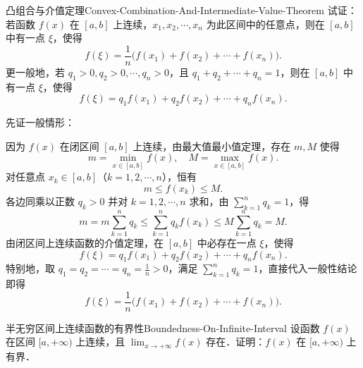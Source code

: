 \begin{problem}{凸组合与介值定理}{Convex-Combination-And-Intermediate-Value-Theorem}
    试证：若函数 $f(x)$ 在 $[a, b]$ 上连续，$x_1, x_2, \cdots, x_n$ 为此区间中的任意点，则在 $[a, b]$ 中有一点 $\xi$，使得
    \begin{equation}
        f(\xi) = \frac{1}{n}\bigl( f(x_1) + f(x_2) + \cdots + f(x_n) \bigr).
    \end{equation}
    更一般地，若 $q_1 > 0, q_2 > 0, \cdots, q_n > 0$，且 $q_1 + q_2 + \cdots + q_n = 1$，则在 $[a, b]$ 中有一点 $\xi$，使得
    \begin{equation}
        f(\xi) = q_1 f(x_1) + q_2 f(x_2) + \cdots + q_n f(x_n).
    \end{equation}
\end{problem}

\begin{myproof}
    先证一般情形：

    因为 $f(x)$ 在闭区间 $[a, b]$ 上连续，由最大值最小值定理，存在 $m, M$ 使得
    \begin{equation}
        m = \min_{x\in [a, b]} f(x), \quad M = \max_{x\in [a, b]} f(x).
    \end{equation}
    对任意点 $x_k \in [a, b]$（$k = 1, 2, \cdots, n$），恒有
    \begin{equation}
        m \leqslant f(x_k) \leqslant M.
    \end{equation}
    各边同乘以正数 $q_k > 0$ 并对 $k = 1, 2, \cdots, n$ 求和，由 $\sum_{k=1}^n q_k = 1$，得
    \begin{equation}
        m = m \sum_{k=1}^n q_k \leqslant \sum_{k=1}^n q_k f(x_k) \leqslant M \sum_{k=1}^n q_k = M.
    \end{equation}
    由闭区间上连续函数的介值定理，在 $[a, b]$ 中必存在一点 $\xi$，使得
    \begin{equation}
        f(\xi) = q_1 f(x_1) + q_2 f(x_2) + \cdots + q_n f(x_n).
    \end{equation}
    特别地，取 $q_1 = q_2 = \cdots = q_n = \frac{1}{n} > 0$，满足 $\sum_{k=1}^n q_k = 1$，直接代入一般性结论即得
    \begin{equation}
        f(\xi) = \frac{1}{n}\bigl( f(x_1) + f(x_2) + \cdots + f(x_n) \bigr).
    \end{equation}
\end{myproof}

\begin{problem}{半无穷区间上连续函数的有界性}{Boundedness-On-Infinite-Interval}
    设函数 $f(x)$ 在区间 $[a, +\infty)$ 上连续，且 $\lim_{x\to +\infty} f(x)$ 存在．证明：$f(x)$ 在 $[a, +\infty)$ 上有界．
\end{problem}

